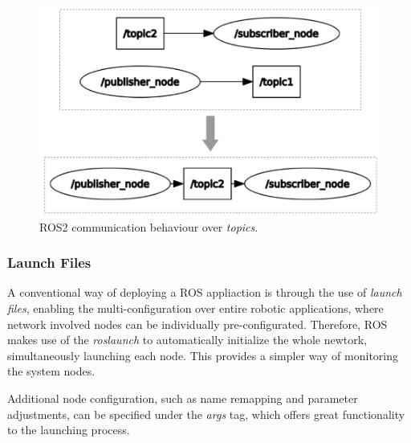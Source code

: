 \begin{figure}[H]
        \centering
        \includegraphics[width=0.4\linewidth]{images/ros2-topics.png}
        \caption{ROS2 communication behaviour over \textit{topics}.}
        \label{fig:ros2-topics}
\end{figure}





\subsubsection{Launch Files}

A conventional way of deploying a ROS appliaction is through the use of \textit{launch files}, enabling the multi-configuration over entire robotic applications, where network involved nodes can be individually pre-configurated. Therefore, ROS makes use of the \textit{roslaunch} to automatically initialize the whole newtork, simultaneously launching each node. This provides a simpler way of monitoring the system nodes.

Additional node configuration, such as name remapping and parameter adjustments, can be specified under the \textit{args} tag, which offers great functionality to the launching process. 

